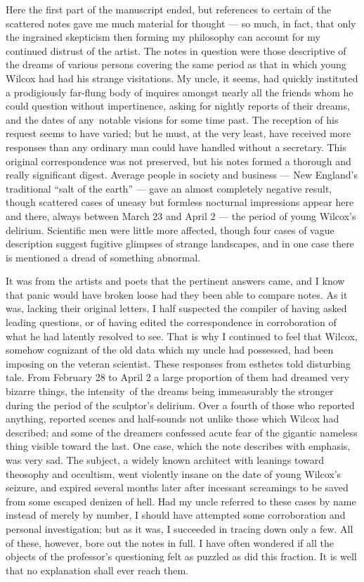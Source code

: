 Here the first part of the manuscript ended, but references to certain
of the scattered notes gave me much material for thought --- so much, in
fact, that only the ingrained skepticism then forming my philosophy can
account for my continued distrust of the artist. The notes in question
were those descriptive of the dreams of various persons covering the
same period as that in which young Wilcox had had his strange
visitations. My uncle, it seems, had quickly instituted a prodigiously
far-flung body of inquires amongst nearly all the friends whom he could
question without impertinence, asking for nightly reports of their
dreams, and the dates of any\est\ notable visions for some time past. The
reception of his request seems to have varied; but he must, at the very
least, have received more responses than any ordinary man could have
handled without a secretary. This original correspondence was not
preserved, but his notes formed a thorough and really significant
digest. Average people in society and business --- New England's
traditional ``salt of the earth'' --- gave an almost completely negative
result, though scattered cases of uneasy but formless nocturnal
impressions appear here and there, always between March 23 and April 2 ---
the period of young Wilcox's delirium. Scientific men were little more
affected, though four cases of vague description suggest fugitive
glimpses of strange landscapes, and in one case there is mentioned a
dread of something abnormal.

It was from the artists and poets that the pertinent answers came, and I
know that panic would have broken loose had they been able to compare
notes. As it was, lacking their original letters, I half suspected the
compiler of having asked leading questions, or of having edited the
correspondence in corroboration of what he had latently resolved to see.
That is why I continued to feel that Wilcox, somehow cognizant of the
old data which my uncle had possessed, had been imposing on the veteran
scientist. These responses from esthetes told disturbing tale. From
February 28 to April 2 a large proportion of them had dreamed very
bizarre things, the intensity\est\ of the dreams being immeasurably the
stronger during the period of the sculptor's delirium. Over a fourth of
those who reported anything, reported scenes and half-sounds not unlike
those which Wilcox had described; and some of the dreamers confessed
acute fear of the gigantic nameless thing visible toward the last. One
case, which the note describes with emphasis, was very sad. The subject,
a widely known architect with leanings toward theosophy and occultism,
went violently insane on the date of young Wilcox's seizure, and expired
several months later after incessant screamings to be saved from some
escaped denizen of hell. Had my uncle referred to these cases by name
instead of merely by number, I should have attempted some corroboration
and personal investigation; but as it was, I succeeded in tracing down
only a few. All of these, however, bore out the notes in full. I have
often wondered if all the objects of the professor's questioning felt as
puzzled as did this fraction. It is well that no explanation shall ever
reach them.

